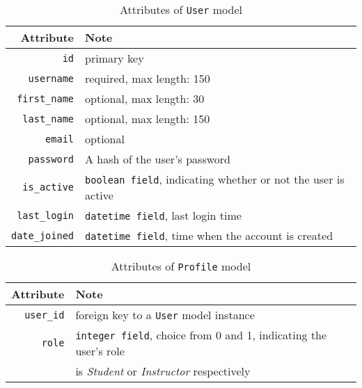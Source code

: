 \begin{table}[ht]
    \centering
    \caption{Attributes of \texttt{User} model}
    \label{tab:USR_ATTR}
    \renewcommand{\arraystretch}{1.3}
    \begin{tabular}[ht]{r|l}
        \hline
        Attribute & Note \\
        \hline
        \hline
        \texttt{id} & primary key \\
        \hline
        \texttt{username} &  required, max length: 150 \\
        \hline
        \texttt{first\_name} &  optional, max length: 30 \\
        \hline
        \texttt{last\_name} &  optional, max length: 150 \\
        \hline
        \texttt{email} & optional\\
        \hline
        \texttt{password} & A hash of the user's password \\
        \hline
        \texttt{is\_active} & \texttt{boolean field}, indicating whether or not the user
            is active \\
        \hline
        \texttt{last\_login} & \texttt{datetime field}, last login time \\
        \hline
        \texttt{date\_joined} & \texttt{datetime field}, time when the account is created \\
        \hline
    \end{tabular}
    \renewcommand{\arraystretch}{1}
\end{table}

\begin{table}[ht]
    \centering
    \caption{Attributes of \texttt{Profile} model}
    \label{tab:PROFILE_ATTR}
    \renewcommand{\arraystretch}{1.3}
    \begin{tabular}[ht]{r|p{4.5in}}
        \hline
        Attribute & Note \\
        \hline
        \hline
        \texttt{user\_id} & foreign key to a \texttt{User} model instance \\
        \hline
        \texttt{role} & \texttt{integer field}, choice from 0 and 1, indicating the
            user's role \\
           & is \emph{Student} or \emph{Instructor} respectively \\
        \hline
    \end{tabular}
    \renewcommand{\arraystretch}{1}
\end{table}


